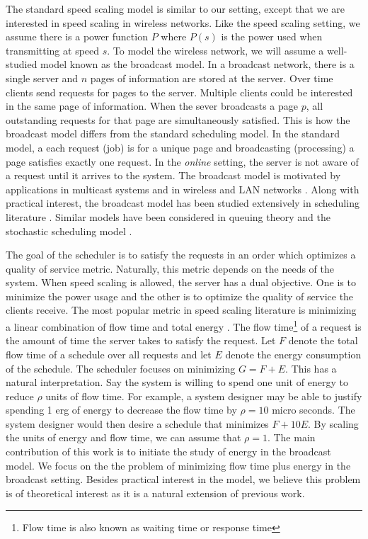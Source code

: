 \documentclass[11pt]{article}
\begin{document}
The standard speed scaling model is similar to our setting, except that we are interested in speed scaling in wireless networks.  Like the speed scaling setting, we assume there  is a power function $P$ where $P(s)$ is the power used when transmitting at speed $s$. To model the wireless network, we will assume a well-studied model known as the broadcast model.  In a broadcast network, there is a single server and $n$ pages of information are stored at the server.  Over time clients send requests for pages to the server.  Multiple clients could be interested in the same page of information.  When the sever broadcasts a page $p$, all outstanding requests for that page are simultaneously satisfied.  This is how the broadcast model differs from the standard scheduling model.  In the standard model, a each request (job) is for a unique page and broadcasting (processing) a page satisfies exactly one request. In the \emph{online} setting, the server is not aware of a request until it arrives to the system.  The broadcast model is motivated by applications in multicast systems and in wireless and LAN networks \cite{Wong88,AcharyaFZ95,AksoyF98,Hall03}.  Along with practical interest, the broadcast model has been studied extensively in scheduling literature \cite{BarnoyBNS98,AksoyF98,AcharyaFZ95,BartalM00,Hall03,GandhiKPS06}.  Similar models have been considered in queuing theory and the stochastic scheduling model \cite{DebS73,Deb84,Weiss79,WeissP81}. 


The goal of the scheduler is to satisfy the requests in an order which optimizes a quality of service metric. Naturally, this metric depends on the needs of the system.  When speed scaling is allowed, the server has a dual objective.   One is to minimize the power usage and the other is to optimize the quality of service the clients receive.  The most popular metric in speed scaling literature is minimizing a  linear combination of flow time and total energy \cite{AlbersF07,BansalPS09,ChanELLMP09,GuptaKP10,BansalCP09}.  The flow time\footnote{Flow time is also known as waiting time or response time} of a request is the amount of time the server takes to satisfy the  request.  Let $F$ denote the total flow time of a schedule over all requests and let $E$ denote the energy consumption of the schedule.  The scheduler focuses on minimizing $G= F+E$. This has a natural interpretation.   Say the system is willing to spend one unit of energy to reduce $\rho$   units of flow time.  For example, a system designer may be able to justify spending 1 erg of energy to decrease the flow time by $\rho =10$ micro seconds.  The system designer would then desire a schedule that minimizes $F + 10 E$.  By scaling the units of energy and flow time, we can assume that $\rho=1$.  The main contribution of this work is to initiate the study of energy in the broadcast model. We focus on the the problem of minimizing flow time plus energy in the broadcast setting. Besides practical interest in the model, we believe this problem is of theoretical interest as it is a natural extension of previous work. \\
\end{document}
